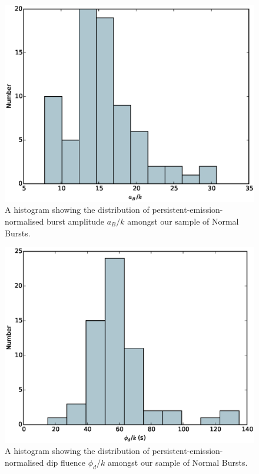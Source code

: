 \begin{figure}
  \centering
  \includegraphics[width=.9\linewidth, trim={0cm 0 0cm 0},clip]{images/appendix_burst_pa_n_hist.eps}
  \caption[Histogram showing the distribution of $a_B/k$ amongst Normal Bursts.]{A histogram showing the distribution of persistent-emission-normalised burst amplitude $a_B/k$ amongst our sample of Normal Bursts.}
  \label{fig:app_hist_ab_n}
\end{figure}

\begin{figure}
  \centering
  \includegraphics[width=.9\linewidth, trim={0cm 0 0cm 0},clip]{images/appendix_dip_aafluence_n_hist.eps}
  \caption[Histogram showing the distribution of $\phi_d/k$ amongst Normal Bursts.]{A histogram showing the distribution of persistent-emission-normalised dip fluence $\phi_d/k$ amongst our sample of Normal Bursts.}
  \label{fig:app_hist_phid_n}
\end{figure}


